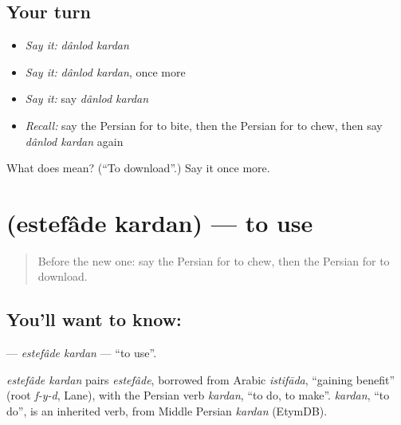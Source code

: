 \subsection*{Your turn}
\begin{itemize}
\raggedright
  \item \emph{Say it:} \emph{dânlod kardan}
  \item \emph{Say it:} \emph{dânlod kardan}, once more
  \item \emph{Say it:} say \emph{dânlod kardan}
  \item \emph{Recall:} say the Persian for to bite, then the Persian for to chew, then say \emph{dânlod kardan} again
\end{itemize}

\begin{tcolorbox}[breakable,colback=teal!4,colframe=teal!35!black,title={Before you move on}]
What does   mean? (\textquotedblleft{}To download\textquotedblright{}.) Say it once more.
\end{tcolorbox}
\section[\texorpdfstring{\fa{استفاده} \fa{کردن} (estefâde kardan)}{استفاده کردن (estefâde kardan)}]{  (estefâde kardan) — to use}

\label{lesson:FA-C256-estefade-kardan}



\begin{quote}
Before the new one: say the Persian for to chew, then the Persian for to download.
\end{quote}

\subsection*{You'll want to know:  }
\textbf{ } — \emph{estefâde kardan} — \textquotedblleft{}to use\textquotedblright{}.

\begin{cousinweb}
\emph{estefâde kardan} pairs \emph{estefâde}, borrowed from Arabic \emph{istifāda}, \textquotedblleft{}gaining benefit\textquotedblright{} (root \emph{f-y-d}, Lane), with the Persian verb \emph{kardan}, \textquotedblleft{}to do, to make\textquotedblright{}. \emph{kardan}, \textquotedblleft{}to do\textquotedblright{}, is an inherited verb, from Middle Persian \emph{kardan} (EtymDB).
\end{cousinweb}

